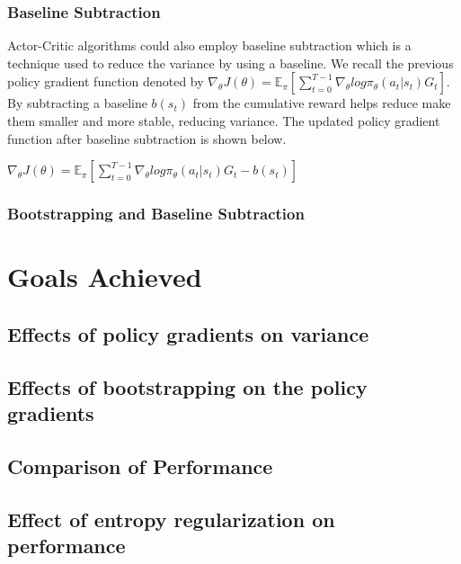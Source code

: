 \documentclass{article}
\begin{document}
\subsubsection{Baseline Subtraction}
Actor-Critic algorithms could also employ baseline subtraction which is a technique used to reduce the variance by using a baseline. We recall the previous policy gradient function denoted by $\nabla_\theta J(\theta) = \mathbb{E}_\pi[\sum _{t=0}^{T-1} \nabla_\theta log\pi_\theta (a_t|s_t)G_t]$. By subtracting a baseline $b(s_t)$ from the cumulative reward helps reduce make them smaller and more stable, reducing variance. The updated policy gradient function after baseline subtraction is shown below. 

$\nabla_\theta J(\theta) = \mathbb{E}_\pi[\sum _{t=0}^{T-1} \nabla_\theta log\pi_\theta (a_t|s_t)G_t - b(s_t)]$



\subsubsection{Bootstrapping and Baseline Subtraction}


\section{Goals Achieved}
\subsection{Effects of policy gradients on variance}
\subsection{Effects of bootstrapping on the policy gradients}
\subsection{Comparison of Performance}
\subsection{Effect of entropy regularization on performance}



\end{document}
